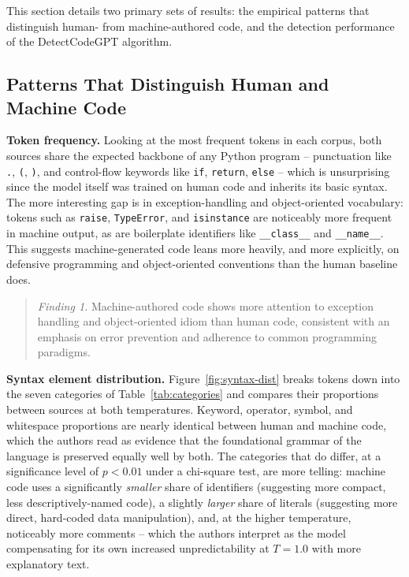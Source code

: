 \documentclass[manuscript,review]{acmart}
\begin{document}
This section details two primary sets of results: the empirical patterns that distinguish human- from machine-authored code, and the detection performance of the DetectCodeGPT algorithm.

\subsection{Patterns That Distinguish Human and Machine Code}

\textbf{Token frequency.} Looking at the most frequent tokens in each corpus, both sources share the expected backbone of any Python program -- punctuation like \texttt{.}, \texttt{(}, \texttt{)}, and control-flow keywords like \texttt{if}, \texttt{return}, \texttt{else} -- which is unsurprising since the model itself was trained on human code and inherits its basic syntax. The more interesting gap is in exception-handling and object-oriented vocabulary: tokens such as \texttt{raise}, \texttt{TypeError}, and \texttt{isinstance} are noticeably more frequent in machine output, as are boilerplate identifiers like \texttt{\_\_class\_\_} and \texttt{\_\_name\_\_}. This suggests machine-generated code leans more heavily, and more explicitly, on defensive programming and object-oriented conventions than the human baseline does.

\begin{quote}
\textit{Finding 1.} Machine-authored code shows more attention to exception handling and object-oriented idiom than human code, consistent with an emphasis on error prevention and adherence to common programming paradigms.
\end{quote}

\textbf{Syntax element distribution.} Figure~\ref{fig:syntax-dist} breaks tokens down into the seven categories of Table~\ref{tab:categories} and compares their proportions between sources at both temperatures. Keyword, operator, symbol, and whitespace proportions are nearly identical between human and machine code, which the authors read as evidence that the foundational grammar of the language is preserved equally well by both. The categories that do differ, at a significance level of $p<0.01$ under a chi-square test, are more telling: machine code uses a significantly \emph{smaller} share of identifiers (suggesting more compact, less descriptively-named code), a slightly \emph{larger} share of literals (suggesting more direct, hard-coded data manipulation), and, at the higher temperature, noticeably more comments -- which the authors interpret as the model compensating for its own increased unpredictability at $T=1.0$ with more explanatory text.
\end{document}
